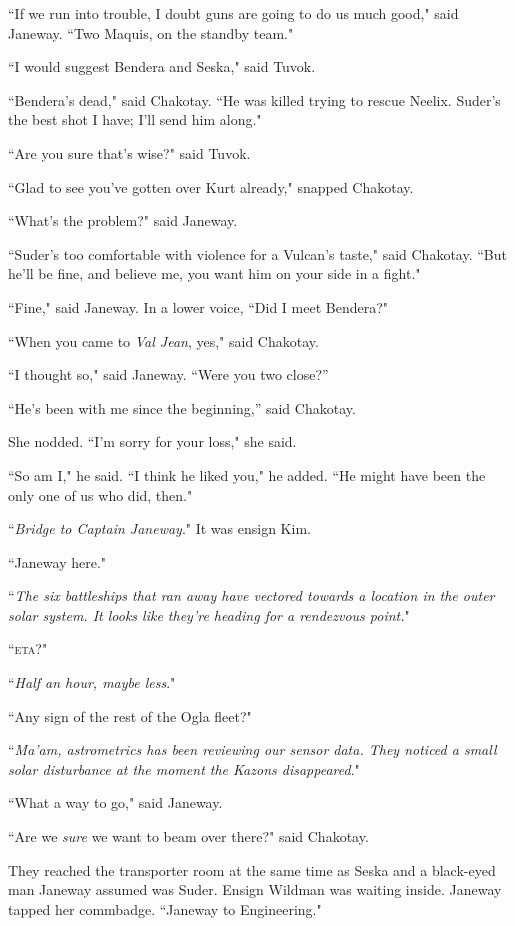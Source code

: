 \documentclass[twoside,letterpaper,12pt]{memoir}
\begin{document}
``If we run into trouble, I doubt guns are going to do us much good," said Janeway. ``Two Maquis, on the standby team." 

``I would suggest Bendera and Seska," said Tuvok. 

``Bendera's dead," said Chakotay. ``He was killed trying to rescue Neelix. Suder's the best shot I have; I'll send him along." 

``Are you sure that's wise?" said Tuvok. 

``Glad to see you've gotten over Kurt already," snapped Chakotay. 

``What's the problem?" said Janeway. 

``Suder's too comfortable with violence for a Vulcan's taste," said Chakotay. ``But he'll be fine, and believe me, you want him on your side in a fight." 

``Fine," said Janeway. In a lower voice, ``Did I meet Bendera?" 

``When you came to \textit{Val Jean}, yes," said Chakotay. 

``I thought so," said Janeway. ``Were you two close?” 

``He’s been with me since the beginning,” said Chakotay. 

She nodded. ``I'm sorry for your loss," she said. 

``So am I," he said. ``I think he liked you," he added. ``He might have been the only one of us who did, then."

``\textit{Bridge to Captain Janeway}." It was ensign Kim. 

``Janeway here." 

``\textit{The six battleships that ran away have vectored towards a location in the outer solar system. It looks like they're heading for a rendezvous point.}" 

``\textsc{eta}?" 

``\textit{Half an hour, maybe less}." 

``Any sign of the rest of the Ogla fleet?" 

``\textit{Ma'am, astrometrics has been reviewing our sensor data. They noticed a small solar disturbance at the moment the Kazons disappeared}." 

``What a way to go," said Janeway. 

``Are we \textit{sure} we want to beam over there?" said Chakotay. 

They reached the transporter room at the same time as Seska and a black-eyed man Janeway assumed was Suder. Ensign Wildman was waiting inside. Janeway tapped her commbadge. ``Janeway to Engineering." 
\end{document}
